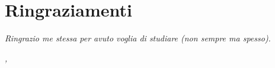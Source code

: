 \cleardoublepage
{}
\thispagestyle{empty}


\begingroup
\let\clearpage\relax
\let\cleardoublepage\relax
\let\cleardoublepage\relax

\section*{Ringraziamenti}

\noindent \textit{Ringrazio me stessa per avuto voglia di studiare (non sempre ma spesso).}\\
\bigskip

\noindent\textit{\myLocation, \myTime}
\hfill \myName

\endgroup
